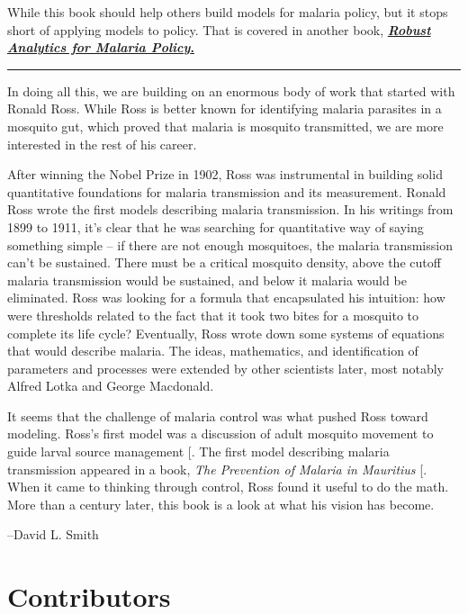 \documentclass[
]{book}
\begin{document}
While this book should help others build models for malaria policy, but it stops short of applying models to policy. That is covered in another book, \href{../../RAMP-Book/_book/index.html}{\textbf{\emph{Robust Analytics for Malaria Policy}.}}

\begin{center}\rule{0.5\linewidth}{0.5pt}\end{center}

In doing all this, we are building on an enormous body of work that started with Ronald Ross. While Ross is better known for identifying malaria parasites in a mosquito gut, which proved that malaria is mosquito transmitted, we are more interested in the rest of his career.

After winning the Nobel Prize in 1902, Ross was instrumental in building solid quantitative foundations for malaria transmission and its measurement. Ronald Ross wrote the first models describing malaria transmission. In his writings from 1899 to 1911, it's clear that he was searching for quantitative way of saying something simple -- if there are not enough mosquitoes, the malaria transmission can't be sustained. There must be a critical mosquito density, above the cutoff malaria transmission would be sustained, and below it malaria would be eliminated. Ross was looking for a formula that encapsulated his intuition: how were thresholds related to the fact that it took two bites for a mosquito to complete its life cycle? Eventually, Ross wrote down some systems of equations that would describe malaria. The ideas, mathematics, and identification of parameters and processes were extended by other scientists later, most notably Alfred Lotka and George Macdonald.

It seems that the challenge of malaria control was what pushed Ross toward modeling. Ross's first model was a discussion of adult mosquito movement to guide larval source management {[}\citeproc{ref-RossR1905LogicalBasis}{12}{]}. The first model describing malaria transmission appeared in a book, \emph{The Prevention of Malaria in Mauritius} {[}\citeproc{ref-RossR1908}{13}{]}. When it came to thinking through control, Ross found it useful to do the math. More than a century later, this book is a look at what his vision has become.

--David L. Smith

\section*{Contributors}\label{contributors}
\end{document}
